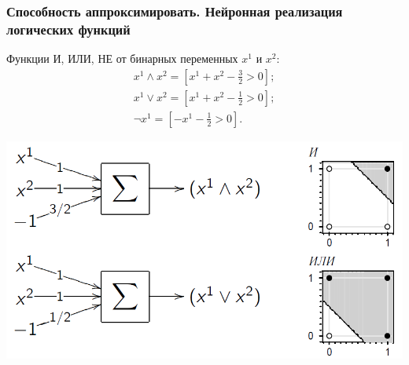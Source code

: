 \documentclass[10pt]{beamer}
\begin{document}
\begin{frame}
\frametitle{Способность аппроксимировать. Нейронная реализация логических функций}
\vspace{0.1cm}
Функции И, ИЛИ, НЕ от бинарных переменных $x^1$ и $x^2$:
\begin{gather*}
x^1 \wedge x^2 = \left[x^1 + x^2 - \frac{3}{2} > 0\right]; \\
x^1 \vee x^2 = \left[x^1 + x^2 - \frac{1}{2} > 0 \right]; \\
\neg x^1 = \left[-x^1 - \frac{1}{2} > 0 \right].
\end{gather*}
 
\begin{center}
	\includegraphics[scale=0.27]{and_or}
\end{center}
\end{frame}  
\end{document}
